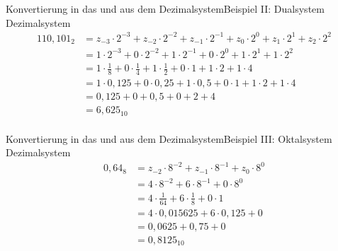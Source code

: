 \documentclass[xelatex,aspectratio=169]{beamer}
\begin{document}
\begin{frame}{Konvertierung in das und aus dem Dezimalsystem}{Beispiel II: Dualsystem \textrightarrow Dezimalsystem}
  \begin{align*}
    110,101_{2} & = z_{-3} \cdot 2^{-3} + z_{-2} \cdot 2^{-2} + z_{-1} \cdot 2^{-1} + z_0 \cdot 2^0 + z_1 \cdot 2^1 + z_2 \cdot 2^2 \\
                & = 1 \cdot 2^{-3} + 0 \cdot 2^{-2} + 1 \cdot 2^{-1} + 0 \cdot 2^0 + 1 \cdot 2^1 + 1 \cdot 2^2                      \\
                & = 1 \cdot \frac{1}{8} + 0 \cdot \frac{1}{4} + 1 \cdot \frac{1}{2} + 0 \cdot 1 + 1 \cdot 2 + 1 \cdot 4             \\
                & = 1 \cdot 0,125 + 0 \cdot 0,25 + 1 \cdot 0,5 + 0 \cdot 1 + 1 \cdot 2 + 1 \cdot 4                                  \\
                & = 0,125 + 0 + 0,5 + 0 + 2 + 4                                                                                     \\
                & = 6,625_{10}                                                                                                      \\
  \end{align*}
\end{frame}

\begin{frame}{Konvertierung in das und aus dem Dezimalsystem}{Beispiel III: Oktalsystem \textrightarrow Dezimalsystem}
  \begin{align*}
    0,64_{8} & = z_{-2} \cdot 8^{-2} + z_{-1} \cdot 8^{-1} + z_0 \cdot 8^0 \\
             & = 4 \cdot 8^{-2} + 6 \cdot 8^{-1} + 0 \cdot 8^0             \\
             & = 4 \cdot \frac{1}{64} + 6 \cdot \frac{1}{8} + 0 \cdot 1    \\
             & = 4 \cdot 0,015625 + 6 \cdot 0,125 + 0                      \\
             & = 0,0625 + 0,75 + 0                                         \\
             & = 0,8125_{10}
  \end{align*}
\end{frame}
\end{document}
